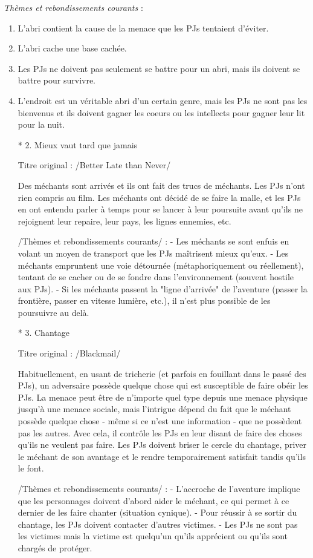 \emph{Thèmes et rebondissements courants} :
\begin{enumerate}
\item L'abri contient la cause de la menace que les PJs tentaient d'éviter.
\item L'abri cache une base cachée.
\item Les PJs ne doivent pas seulement se battre pour un abri, mais ils doivent se battre pour survivre.
\item L'endroit est un véritable abri d'un certain genre, mais les PJs ne sont pas les bienvenus et ils doivent gagner les coeurs ou les intellects pour gagner leur lit pour la nuit.

* 2. Mieux vaut tard que jamais

Titre original : /Better Late than Never/

Des méchants sont arrivés et ils ont fait des trucs de méchants. Les PJs n'ont rien compris au film. Les méchants ont décidé de se faire la malle, et les PJs en ont entendu parler à temps pour se lancer à leur poursuite avant qu'ils ne rejoignent leur repaire, leur pays, les lignes ennemies, etc.

/Thèmes et rebondissements courants/ :
- Les méchants se sont enfuis en volant un moyen de transport que les PJs maîtrisent mieux qu'eux.
- Les méchants empruntent une voie détournée (métaphoriquement ou réellement), tentant de se cacher ou de se fondre dans l'environnement (souvent hostile aux PJs).
- Si les méchants passent la "ligne d'arrivée" de l'aventure (passer la frontière, passer en vitesse lumière, etc.), il n'est plus possible de les poursuivre au delà.

* 3. Chantage

Titre original : /Blackmail/

Habituellement, en usant de tricherie (et parfois en fouillant dans le passé des PJs), un adversaire possède quelque chose qui est susceptible de faire obéir les PJs. La menace peut être de n'importe quel type depuis une menace physique jusqu'à une menace sociale, mais l'intrigue dépend du fait que le méchant possède quelque chose - même si ce n'est une information - que ne possèdent pas les autres. Avec cela, il contrôle les PJs en leur disant de faire des choses qu'ils ne veulent pas faire. Les PJs doivent briser le cercle du chantage, priver le méchant de son avantage et le rendre temporairement satisfait tandis qu'ils le font.

/Thèmes et rebondissements courants/ :
- L'accroche de l'aventure implique que les personnages doivent d'abord aider le méchant, ce qui permet à ce dernier de les faire chanter (situation cynique).
- Pour réussir à se sortir du chantage, les PJs doivent contacter d'autres victimes.
- Les PJs ne sont pas les victimes mais la victime est quelqu'un qu'ils apprécient ou qu'ils sont chargés de protéger.


\end{enumerate}
